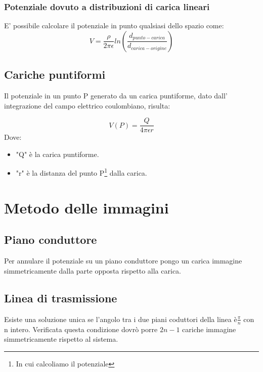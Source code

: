 \documentclass[10pt,a4paper]{report}
\begin{document}
		\subsection{Potenziale dovuto a distribuzioni di carica lineari}
		E' possibile calcolare il potenziale in punto qualsiasi dello spazio come: 
		\begin{equation}
		V=\frac{\rho}{2\pi \epsilon}ln(\frac{d_{punto-carica}}{d_{carica-origine}})
		\end{equation}

	\section{Cariche puntiformi}

		Il potenziale in un punto P generato da un carica puntiforme, dato dall' integrazione del campo elettrico coulombiano, risulta:

		\begin{equation}
		V(P)=\frac{Q}{4\pi \epsilon r}
		\end{equation}
		Dove:
		\begin{itemize}
		\item "Q" è la carica puntiforme.

		\item "r" è la distanza del punto P\footnote{In cui calcoliamo il potenziale} dalla carica.
		\end{itemize}

\chapter{Metodo delle immagini}	


	\section{Piano conduttore}

	Per annulare il potenziale su un piano conduttore pongo un carica immagine simmetricamente dalla parte opposta rispetto alla carica.

	\section{Linea di trasmissione}

	Esiste una soluzione unica se l'angolo tra i due piani coduttori della linea è$\frac{\pi}{n}$ con n intero.
	Verificata questa condizione dovrò porre $2n-1$ cariche immagine simmetricamente rispetto al sistema.
\end{document}
